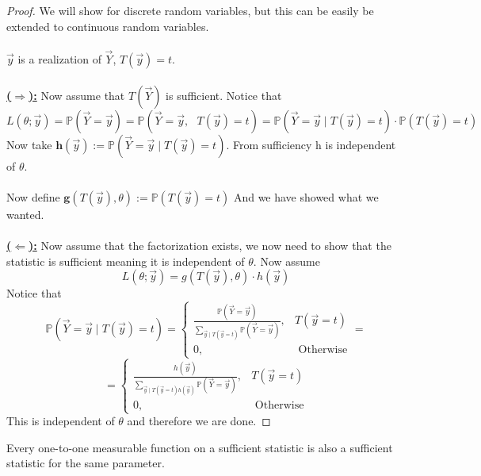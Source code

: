 \documentclass[../main.tex]{subfiles}
\begin{document}
\begin{proof}
We will show for discrete random variables, but this can be easily be extended to continuous random variables. \\\\
$\overrightarrow{y}$ is a realization of $\overrightarrow{Y}$, $T(\overrightarrow{y})=t$. 
\\\\
\underline{\textbf{($\Longrightarrow$):}}
Now assume that $T(\overrightarrow{Y})$ is sufficient. Notice that \[L(\theta;\overrightarrow{y}) = \mathbb{P}(\overrightarrow{Y}=\overrightarrow{y}) = \mathbb{P}(\overrightarrow{Y}=\overrightarrow{y}, \text{ } T(\overrightarrow{y}) =t) = \mathbb{P}(\overrightarrow{Y}=\overrightarrow{y}\mid T(\overrightarrow{y}) =t)\cdot\mathbb{P}(T(\overrightarrow{y}) =t)\]
Now take $\textbf{h}(\overrightarrow{y}):=\mathbb{P}(\overrightarrow{Y}=\overrightarrow{y}\mid T(\overrightarrow{y}) =t)$. From sufficiency h is independent of $\theta$. \\\\
Now define $\textbf{g}(T(\overrightarrow{y}), \theta):=\mathbb{P}(T(\overrightarrow{y}) =t)$
And we have showed what we wanted. \\\\
\underline{\textbf{($\Longleftarrow$):}}
Now assume that the factorization exists, we now need to show that the statistic is sufficient meaning it is independent of $\theta$.
Now assume \[L(\theta;\overrightarrow{y}) = g(T(\overrightarrow{y}),\theta)\cdot h(\overrightarrow{y})\]
Notice that \[\mathbb{P}(\overrightarrow{Y}=\overrightarrow{y}\mid T(\overrightarrow{y})= t)  =\begin{cases}
\frac{\mathbb{P}(\overrightarrow{Y}=\overrightarrow{y})}{\sum_{\overrightarrow{y}\mid T(\overrightarrow{y}=t)}\mathbb{P}(\overrightarrow{Y}=\overrightarrow{y})}, & T(\overrightarrow{y}=t) \\ 0, & \text{ Otherwise}\end{cases} =\]
\[ =\begin{cases}\frac{h(\overrightarrow{y})}{\sum_{\overrightarrow{y}\mid T(\overrightarrow{y}=t) h(\overrightarrow{y})}\mathbb{P}(\overrightarrow{Y}=\overrightarrow{y})} , & T(\overrightarrow{y}=t) \\ 0, & \text{ Otherwise}\end{cases}\]
This is independent of $\theta$ and therefore we are done. \end{proof}
\begin{claim} Every one-to-one measurable function on a sufficient statistic is also a sufficient statistic for the same parameter. \end{claim}
\end{document}
